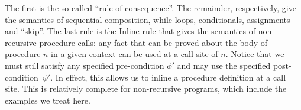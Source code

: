 \noindent
The first is the so-called ``rule of consequence''. The remainder, respectively, give the semantics of
sequential composition, while loops, conditionals, assignments and ``skip''.
The last rule is the Inline rule that gives the semantics of non-recursive procedure calls:
any fact that can be proved about the body of procedure $n$ in a
given context can be used at a call site of $n$. Notice that we must still satisfy any
specified pre-condition $\phi'$ and may use the specified post-condition~$\psi'$.
In effect, this allows us to inline a procedure definition at a call site.
This is relatively complete for non-recursive programs, which include the examples we treat here.

%
%





